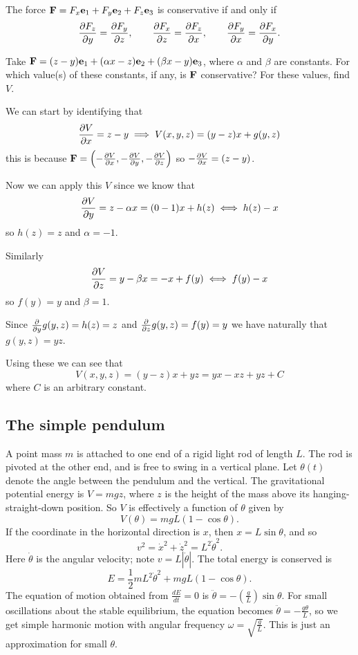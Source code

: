 \documentclass[10pt, a4paper]{article}
\begin{document}
\begin{remark}
    The force $\mbf{F} = F_x\mbf{e}_1 + F_y\mbf{e}_2 + F_z\mbf{e}_3$ is conservative if and only if
    \[
    \pd[F_z]{y} = \pd[F_y]{z},\qquad\pd[F_x]{z} = \pd[F_z]{x},\qquad\pd[F_y]{x} = \pd[F_x]{y}.
    \]
\end{remark}

\begin{example}
    Take $\mbf{F} = (z - y)\mbf{e}_1 + (\alpha x - z)\mbf{e}_2 + (\beta x - y)\mbf{e}_3$,
    where $\alpha$ and $\beta$ are constants.
    For which value(s) of these constants,
    if any,
    is $\mbf{F}$ conservative?
    For these values,
    find $V$.

    \begin{solution}
        We can start by identifying that
        \[
        \pd[V]{x} = z - y \implies V(x, y, z) = (y - z)x + g(y, z)
        \]
        this is because $\mbf{F} = \left(-\pd[V]{x}, -\pd[V]{y}, -\pd[V]{z}\right)$ so $-\pd[V]{x} = (z - y)$.

        Now we can apply this $V$ since we know that
        \[
        \pd[V]{y} = z - \alpha x = (0 - 1)x + h(z) \iff h(z) - x
        \]
        so $h(z) = z$ and $\alpha = -1$.

        Similarly
        \[
        \pd[V]{z} = y - \beta x = -x + f(y) \iff f(y) - x
        \]
        so $f(y) = y$ and $\beta = 1$.

        Since $\pd{y}g(y, z) = h(z) = z$ and $\pd{z}g(y, z) = f(y) = y$ we have naturally that $g(y, z) = yz$.

        Using these we can see that
        \[
        V(x, y, z) = (y - z)x + yz = yx - xz + yz + C
        \]
        where $C$ is an arbitrary constant.
    \end{solution}
\end{example}

\subsection{The simple pendulum}
A point mass $m$ is attached to one end of a rigid light rod of length $L$.
The rod is pivoted at the other end,
and is free to swing in a vertical plane.
Let $\theta(t)$ denote the angle between the pendulum and the vertical.
The gravitational potential energy is $V = mgz$,
where $z$ is the height of the mass above its hanging-straight-down position.
So $V$ is effectively a function of $\theta$ given by
\[
V(\theta) = mgL(1 - \cos{\theta}).
\]
If the coordinate in the horizontal direction is $x$,
then $x = L\sin{\theta}$,
and so
\[
v ^ 2 = \dot{x} ^ 2 + \dot{z} ^ 2 = L ^ 2\dot{\theta} ^ 2.
\]
Here $\dot{\theta}$ is the angular velocity;
note $v = L|\dot{\theta}|$.
The total energy is conserved is
\[
E = \frac{1}{2}mL ^ 2\dot{\theta} ^ 2 + mgL(1 - \cos{\theta}).
\]
The equation of motion obtained from $\frac{dE}{dt} = 0$ is $\ddot{\theta} = -\left(\frac{g}{L}\right)\sin{\theta}$.
For small oscillations about the stable equilibrium,
the equation becomes $\ddot{\theta} = -\frac{g\theta}{L}$,
so we get simple harmonic motion with angular frequency $\omega = \sqrt{\frac{g}{L}}$.
This is just an approximation for small $\theta$.
\end{document}
